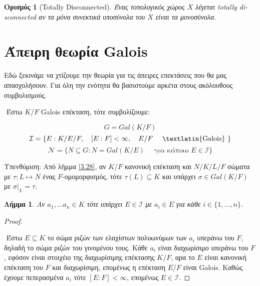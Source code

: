 \documentclass[oneside,a4paper]{article}
\newtheorem{lemma}{Λήμμα}
\newtheorem*{defn}{Ορισμός}
\newcommand {\tl}{\textlatin}
\begin{document}
\begin{defn}[\tl{Totally Disconnected}]
	Ένας τοπολογικός χώρος $X$ λέγεται \tl{totally disconnected} αν τα μόνα συνεκτικά υποσύνολα του $X$ είναι τα μονοσύνολα.
\end{defn}


















\pagebreak
\section{Άπειρη θεωρία \tl{Galois}}
\vspace{1cm}

Εδώ ξεκινάμε να χτίζουμε την θεωρία για τις άπειρες επεκτάσεις που θα μας απασχολήσουν. Για όλη την ενότητα θα βασιστούμε αρκέτα στους ακόλουθους συμβολισμούς.

$ $\newline
\noindent Έστω $K/F$ \tl{Galois} επέκταση, τότε συμβολίζουμε:

$$G=Gal(K/F)$$
$$\mathcal{I} = \{ E: K/E/F , \quad [E:F]<\infty , \quad E/F \quad\text{ \tl{Galois} } \}$$
$$\mathcal{N} = \{N \subseteq G: N = Gal(K/E) \quad\text{ για κάποιo } E \in \mathcal{I} \}$$

Υπενθύμιση: Από λήμμα \ref{3.28}, αν $K/F$ κανονική επέκταση και $N/K/L/F$ σώματα με $\tau :L \mapsto N$ ένας $F$-ομομορφισμός, τότε $\tau(L) \subseteq K$ και υπάρχει $\sigma \in Gal(K/F)$ με $\sigma|_L = \tau$.


\begin{lemma} \label{17.1} Aν $a_1 , \ldots a_n \in K$ τότε υπάρχει $E \in \mathcal{I}$ με $a_i \in E$ για κάθε $i \in \{1,\dots, n\}$.
\end{lemma}
\begin{proof} $ $%


$ $\newline
Έστω $E\subseteq K$ το σώμα ριζών των ελαχίστων πολυωνύμων των $a_i$ υπεράνω του $F$, δηλαδή το σώμα ριζών του γινομένου τους. Kάθε $a_i$ είναι διαχωρίσιμο υπεράνω του $F$, εφόσον είναι στοιχέιο της διαχωρίσιμης επέκτασης $K/F$, αρα το $E$ είναι κανονική επέκταση του $F$ και διαχωρίσιμη, επομένως η επέκταση $E/F$ είναι \tl{Galois}. Καθώς έχουμε πεπερασμένα $a_i$ τότε $[E:F]< \infty$, επομένως $E \in \mathcal{I}$.

\end{proof}
\end{document}
